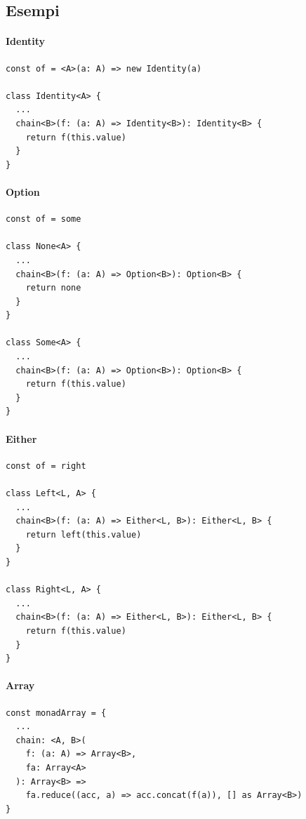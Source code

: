 \documentclass[12pt]{article}
\begin{document}
\subsection{Esempi}

\paragraph{Identity}

\begin{verbatim}
const of = <A>(a: A) => new Identity(a)

class Identity<A> {
  ...
  chain<B>(f: (a: A) => Identity<B>): Identity<B> {
    return f(this.value)
  }
}
\end{verbatim}

\paragraph{Option}

\begin{verbatim}
const of = some

class None<A> {
  ...
  chain<B>(f: (a: A) => Option<B>): Option<B> {
    return none
  }
}

class Some<A> {
  ...
  chain<B>(f: (a: A) => Option<B>): Option<B> {
    return f(this.value)
  }
}
\end{verbatim}

\paragraph{Either}

\begin{verbatim}
const of = right

class Left<L, A> {
  ...
  chain<B>(f: (a: A) => Either<L, B>): Either<L, B> {
    return left(this.value)
  }
}

class Right<L, A> {
  ...
  chain<B>(f: (a: A) => Either<L, B>): Either<L, B> {
    return f(this.value)
  }
}
\end{verbatim}

\paragraph{Array}

\begin{verbatim}
const monadArray = {
  ...
  chain: <A, B>(
    f: (a: A) => Array<B>,
    fa: Array<A>
  ): Array<B> =>
    fa.reduce((acc, a) => acc.concat(f(a)), [] as Array<B>)
}
\end{verbatim}
\end{document}
